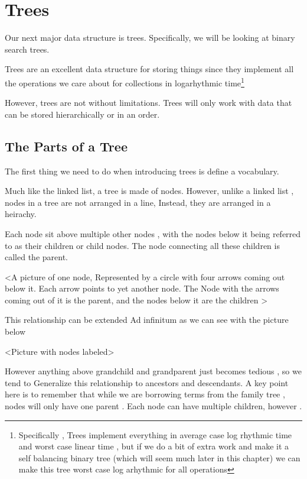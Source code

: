\chapter{Trees}


Our next major data structure is trees.  Specifically, we will be looking at binary search trees.

Trees are an excellent data structure for storing things since they implement all the operations we care about for collections in logarhythmic time\footnote{Specifically , Trees implement everything in average case log rhythmic time and worst case linear time , but if we do a bit of extra work and make it a self balancing binary tree (which will seem much later in this chapter) we can make this tree worst case log arhythmic for all operations}


However, trees are not without limitations.  Trees will only work with data that can be stored hierarchically or in an order.

\section{The Parts of a Tree}

The first thing we need to do when introducing trees is define a vocabulary.  

Much like the linked list, a tree is made of nodes.
However, unlike a linked list , nodes in a tree are not arranged in a line,
Instead, they are arranged in a heirachy.

Each node sit above multiple other nodes , with the nodes below it being referred to as their children or child nodes.  The node connecting all these children is called the parent.

<A picture of one node, Represented by a circle with four arrows coming out below it. Each arrow points to yet another node.  The Node with the arrows coming out of it is the parent, and the nodes below it are the children >


This relationship can be extended Ad infinitum as we can see with the picture below 


<Picture with nodes labeled>


However anything above grandchild and grandparent just becomes tedious , so we tend to  Generalize this relationship to ancestors and descendants.  A key point here is to remember that while we are borrowing terms from the family tree , nodes will only have one parent . Each node can have multiple children, however .


